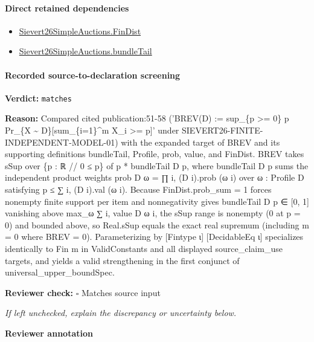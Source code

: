 \documentclass[10pt]{article}
\newcommand{\reviewerbox}{%
  \par\noindent\fbox{\parbox{0.96\linewidth}{\rule{0pt}{0.38in}}}\par
}
\newcommand{\reviewmatch}[1]{%
  \par\noindent\textbf{Reviewer check:} $\square$\; #1\par
  \noindent\emph{If left unchecked, explain the discrepancy or uncertainty below.}\par
}
\begin{document}
\paragraph{Direct retained dependencies}
\begin{itemize}\raggedright
\item \hyperlink{paper-prerequisite-5b39ea21863ce14e}{Sievert26\allowbreak{}Simple\allowbreak{}Auctions.\allowbreak{}Fin\allowbreak{}Dist}
\item \hyperlink{governing-declaration-d6af1c790788c293}{Sievert26\allowbreak{}Simple\allowbreak{}Auctions.\allowbreak{}bundle\allowbreak{}Tail}
\end{itemize}
\paragraph{Recorded source-to-declaration screening}
\textbf{Verdict:} \texttt{matches}
\\
{\raggedright
\textbf{Reason:} Compared cited publication:\allowbreak{}51-\allowbreak{}58 ('BREV(D) :\allowbreak{}= sup\_\allowbreak{}\{p >= 0\} p Pr\_\allowbreak{}\{X \textasciitilde{} D\}[sum\_\allowbreak{}\{i=1\}\textasciicircum{}m X\_\allowbreak{}i >= p]' under SIEVERT26-\allowbreak{}FINITE-\allowbreak{}INDEPENDENT-\allowbreak{}MODEL-\allowbreak{}01) with the expanded target of BREV and its supporting definitions bundleTail, Profile, prob, value, and FinDist.\allowbreak{} BREV takes sSup over \{p :\allowbreak{} ℝ /\allowbreak{}/\allowbreak{} 0 ≤ p\} of p * bundleTail D p, where bundleTail D p sums the independent product weights prob D ω = ∏ i, (D i).\allowbreak{}prob (ω i) over ω :\allowbreak{} Profile D satisfying p ≤ ∑ i, (D i).\allowbreak{}val (ω i).\allowbreak{} Because FinDist.\allowbreak{}prob\_\allowbreak{}sum = 1 forces nonempty finite support per item and nonnegativity gives bundleTail D p ∈ [0, 1] vanishing above max\_\allowbreak{}ω ∑ i, value D ω i, the sSup range is nonempty (0 at p = 0) and bounded above, so Real.\allowbreak{}sSup equals the exact real supremum (including m = 0 where BREV = 0).\allowbreak{} Parameterizing by [Fintype ι] [DecidableEq ι] specializes identically to Fin m in ValidConstants and all displayed source\_\allowbreak{}claim\_\allowbreak{}use targets, and yields a valid strengthening in the first conjunct of universal\_\allowbreak{}upper\_\allowbreak{}boundSpec.\allowbreak{}
\par}
\reviewmatch{Matches source input}
\noindent\textbf{Reviewer annotation}\par
\reviewerbox
\clearpage
\hypertarget{paper-prerequisite-b1d558d0810cbb0e}{}
\end{document}
